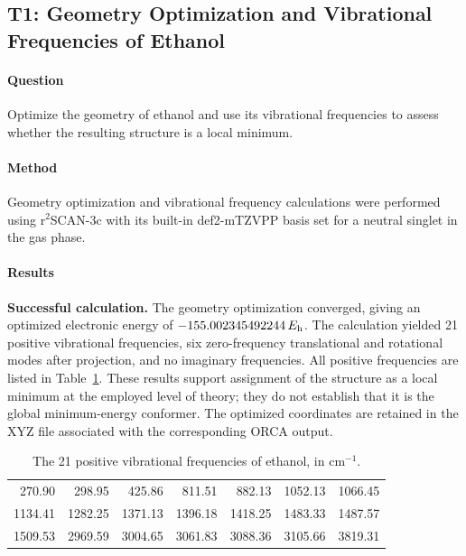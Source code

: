 \subsection{T1: Geometry Optimization and Vibrational Frequencies of Ethanol}
\paragraph{Question}
Optimize the geometry of ethanol and use its vibrational frequencies to assess whether the resulting structure is a local minimum.

\paragraph{Method}
Geometry optimization and vibrational frequency calculations were performed using r$^{2}$SCAN-3c with its built-in def2-mTZVPP basis set for a neutral singlet in the gas phase.

\paragraph{Results}
\textbf{Successful calculation.} The geometry optimization converged, giving an optimized electronic energy of $-155.002345492244\,E_{\mathrm h}$.
The calculation yielded 21 positive vibrational frequencies, six zero-frequency translational and rotational modes after projection, and no imaginary frequencies.
All positive frequencies are listed in Table~\ref{tab:t1-frequencies}.
These results support assignment of the structure as a local minimum at the employed level of theory; they do not establish that it is the global minimum-energy conformer.
The optimized coordinates are retained in the XYZ file associated with the corresponding ORCA output.

\begin{table}[H]
  \centering\small
  \caption{The 21 positive vibrational frequencies of ethanol, in cm$^{-1}$.}
  \label{tab:t1-frequencies}
  \begin{tabular}{rrrrrrr}
    \toprule
    270.90 & 298.95 & 425.86 & 811.51 & 882.13 & 1052.13 & 1066.45\\
    1134.41 & 1282.25 & 1371.13 & 1396.18 & 1418.25 & 1483.33 & 1487.57\\
    1509.53 & 2969.59 & 3004.65 & 3061.83 & 3088.36 & 3105.66 & 3819.31\\
    \bottomrule
  \end{tabular}
\end{table}

